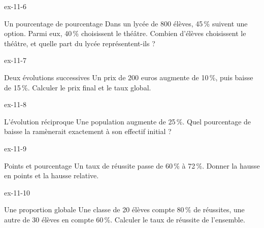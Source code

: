 \clearpage{}
\begin{blocLivre}{ex-11-6}
\begin{exercice}[2]{Un pourcentage de pourcentage}
Dans un lycée de 800 élèves, 45\,\% suivent une option. Parmi eux, 40\,\% choisissent le théâtre. Combien d’élèves choisissent le théâtre, et quelle part du lycée représentent-ils ?
\label{fig-ex-11-6}
\end{exercice}
\end{blocLivre}
\begin{blocLivre}{ex-11-7}
\begin{exercice}[2]{Deux évolutions successives}
Un prix de 200 euros augmente de 10\,\%, puis baisse de 15\,\%. Calculer le prix final et le taux global.
\end{exercice}
\end{blocLivre}
\begin{blocLivre}{ex-11-8}
\begin{exercice}[2]{L’évolution réciproque}
Une population augmente de 25\,\%. Quel pourcentage de baisse la ramènerait exactement à son effectif initial ?
\end{exercice}
\end{blocLivre}
\begin{blocLivre}{ex-11-9}
\begin{exercice}[2]{Points et pourcentage}
Un taux de réussite passe de 60\,\% à 72\,\%. Donner la hausse en points et la hausse relative.
\end{exercice}
\end{blocLivre}
\begin{blocLivre}{ex-11-10}
\begin{exercice}[2]{Une proportion globale}
Une classe de 20 élèves compte 80\,\% de réussites, une autre de 30 élèves en compte 60\,\%. Calculer le taux de réussite de l’ensemble.
\end{exercice}
\end{blocLivre}

